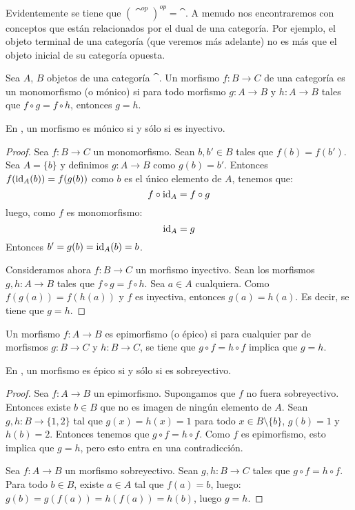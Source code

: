 Evidentemente se tiene que $\left(\cat^{op}\right)^{op} = \cat$.
A menudo nos encontraremos con conceptos que están relacionados por el dual de una categoría.
Por ejemplo, el objeto terminal de una categoría (que veremos más adelante) no es más que el objeto inicial de su categoría opuesta.

\begin{definition}
Sea $A$, $B$ objetos de una categoría $\cat$.
Un morfismo $f \colon B \to C$ de una categoría es un monomorfismo (o mónico) si para todo morfismo $g \colon A \to B$ y $h \colon A \to B$ tales que $f \circ g = f \circ h$, entonces $g = h$.
\end{definition}

\begin{proposition}
En \Set, un morfismo es mónico si y sólo si es inyectivo.
\end{proposition}

\begin{proof}
Sea $f \colon B \to C$ un monomorfismo. Sean $b, b' \in B$ tales que $f(b) = f(b')$. Sea $A = \{b\}$ y definimos $g \colon A \to B$ como $g(b)=b'$.
Entonces $f(\operatorname{id}_A(b)) = f(g(b))$
como $b$ es el único elemento de $A$, tenemos que:
\[ f \circ \operatorname{id}_A = f \circ g \]
luego, como $f$ es monomorfismo:
\[ \operatorname{id}_A = g \]
Entonces $b'=g(b)=\operatorname{id}_A(b)=b$.

Consideramos ahora $f \colon B \to C$ un morfismo inyectivo.
Sean los morfismos $g, h \colon A \to B$ tales que $f \circ g = f \circ h$.
Sea $a \in A$ cualquiera. Como $f(g(a)) = f(h(a))$ y $f$ es inyectiva, entonces $g(a) = h(a)$.
Es decir, se tiene que $g = h$. 
\end{proof}

\begin{definition}
Un morfismo $f \colon A \to B$ es epimorfismo (o épico) si para cualquier par de morfismos $g \colon B \to C$ y $h \colon B \to C$, se tiene que $g \circ f = h \circ f$ implica que $g = h$.
\end{definition}

\begin{proposition}
En \Set, un morfismo es épico si y sólo si es sobreyectivo.
\end{proposition}

\begin{proof}
Sea $f \colon A \to B$ un epimorfismo. Supongamos que $f$ no fuera sobreyectivo. Entonces existe $b \in B$ que no es imagen de ningún elemento de $A$. Sean $g, h \colon B \to \{1,2\}$ tal que $g(x)=h(x)=1$ para todo $x \in B \setminus \{b\}$, $g(b) = 1$ y $h(b) = 2$. Entonces tenemos que $g \circ f = h \circ f$. Como $f$ es epimorfismo, esto implica que $g = h$, pero esto entra en una contradicción.

Sea $f \colon A \to B$ un morfismo sobreyectivo. Sean $g, h \colon B \to C$ tales que $g \circ f = h \circ f$. Para todo $b \in B$, existe $a \in A$ tal que $f(a)=b$, luego: $g(b) = g(f(a)) = h(f(a)) = h(b)$, luego $g = h$.
\end{proof}

